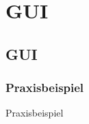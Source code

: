 \section{GUI}

\subsection{GUI}
\begin{frame}
	\frametitle{Praxisbeispiel}
	\huge Praxisbeispiel
\end{frame}
